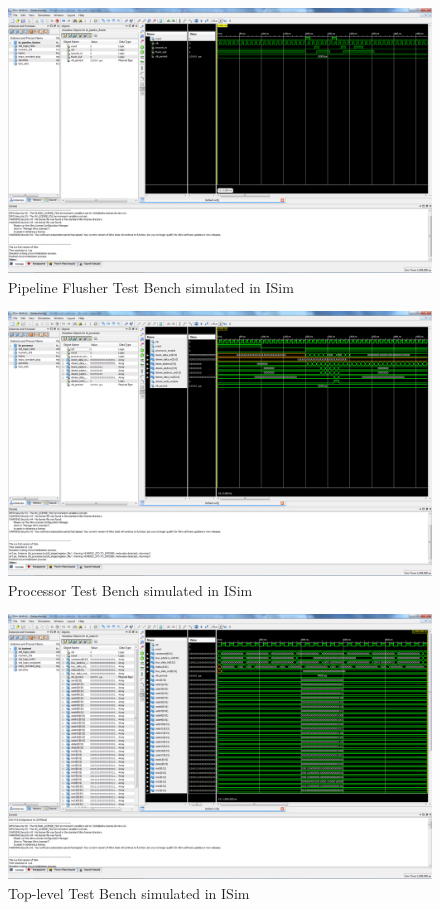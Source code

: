 \begin{figure}
    \includegraphics[width=\textwidth]{illustrations/tb_pipeline_flusher.PNG}
    \caption{Pipeline Flusher Test Bench simulated in ISim}
\end{figure}

\begin{figure}
    \includegraphics[width=\textwidth]{illustrations/tb_processor.PNG}
    \caption{Processor Test Bench simulated in ISim}
\end{figure}

\begin{figure}
    \includegraphics[width=\textwidth]{illustrations/tb_toplevel.PNG}
    \caption{Top-level Test Bench simulated in ISim}
\end{figure}

